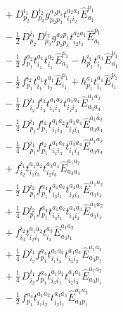 \documentclass[11pt]{article}
\begin{document}
\begin{align}
&\quad + D^{i_{1}}_{p_{2}} D^{i_{2}}_{p_{3}} g^{a_{2}p_{1}}_{p_{2}p_{3}} t^{a_{2}a_{1}}_{i_{1}i_{2}} \hat{E}^{p_{1}}_{a_{1}} \\
&\quad - \tfrac{1}{2}\, D^{i_{1}}_{p_{2}} D^{i_{2}}_{p_{3}} g^{a_{2}p_{1}}_{p_{2}p_{3}} t^{a_{2}a_{1}}_{i_{2}i_{1}} \hat{E}^{p_{1}}_{a_{1}} \\
&\quad - \tfrac{1}{2}\, f^{a_{2}}_{p_{1}} t^{a_{1}}_{i_{1}} t^{a_{2}}_{i_{1}} \hat{E}^{p_{1}}_{a_{1}} - h^{i_{1}}_{p_{1}} t^{a_{1}}_{i_{1}} \hat{E}^{p_{1}}_{a_{1}} \\
&\quad - \tfrac{1}{2}\, f^{i_{2}}_{p_{1}} t^{a_{1}}_{i_{1}} t^{a_{1}}_{i_{2}} \hat{E}^{p_{1}}_{i_{1}} + h^{a_{1}}_{p_{1}} t^{a_{1}}_{i_{1}} \hat{E}^{p_{1}}_{i_{1}} \\
&\quad - \tfrac{1}{2}\, D^{i_{1}}_{i_{2}} f^{i_{3}}_{i_{4}} t^{a_{1}a_{2}}_{i_{1}i_{3}} t^{a_{3}a_{4}}_{i_{2}i_{4}} \hat{E}^{a_{1}a_{2}}_{a_{3}a_{4}} \\
&\quad - \tfrac{1}{4}\, D^{i_{1}}_{p_{1}} f^{i_{2}}_{p_{1}} t^{a_{1}a_{2}}_{i_{1}i_{3}} t^{a_{3}a_{4}}_{i_{2}i_{3}} \hat{E}^{a_{1}a_{2}}_{a_{3}a_{4}} \\
&\quad - \tfrac{1}{4}\, D^{i_{1}}_{p_{1}} f^{i_{2}}_{p_{1}} t^{a_{1}a_{2}}_{i_{2}i_{3}} t^{a_{3}a_{4}}_{i_{1}i_{3}} \hat{E}^{a_{1}a_{2}}_{a_{3}a_{4}} \\
&\quad + f^{i_{1}}_{i_{2}} t^{a_{1}a_{2}}_{i_{1}i_{3}} t^{a_{3}a_{4}}_{i_{2}i_{3}} \hat{E}^{a_{1}a_{2}}_{a_{3}a_{4}} \\
&\quad - \tfrac{1}{2}\, D^{i_{2}}_{p_{1}} f^{a_{4}}_{p_{1}} t^{a_{1}a_{2}}_{i_{3}i_{1}} t^{a_{4}a_{3}}_{i_{2}i_{3}} \hat{E}^{a_{1}a_{2}}_{a_{3}i_{1}} \\
&\quad + \tfrac{1}{4}\, D^{i_{2}}_{p_{1}} f^{a_{4}}_{p_{1}} t^{a_{1}a_{2}}_{i_{3}i_{1}} t^{a_{4}a_{3}}_{i_{3}i_{2}} \hat{E}^{a_{1}a_{2}}_{a_{3}i_{1}} \\
&\quad + f^{i_{2}}_{i_{3}} t^{a_{1}a_{2}}_{i_{2}i_{1}} t^{a_{3}}_{i_{3}} \hat{E}^{a_{1}a_{2}}_{a_{3}i_{1}} \\
&\quad + \tfrac{1}{4}\, D^{i_{1}}_{i_{2}} f^{a_{4}}_{p_{1}} t^{a_{1}a_{2}}_{i_{1}i_{3}} t^{a_{4}a_{3}}_{i_{3}i_{2}} \hat{E}^{a_{1}a_{2}}_{a_{3}p_{1}} \\
&\quad + \tfrac{1}{4}\, D^{i_{1}}_{i_{2}} f^{a_{4}}_{p_{1}} t^{a_{1}a_{2}}_{i_{3}i_{1}} t^{a_{4}a_{3}}_{i_{2}i_{3}} \hat{E}^{a_{1}a_{2}}_{a_{3}p_{1}} \\
&\quad - \tfrac{1}{2}\, f^{a_{4}}_{p_{1}} t^{a_{1}a_{2}}_{i_{1}i_{2}} t^{a_{4}a_{3}}_{i_{2}i_{1}} \hat{E}^{a_{1}a_{2}}_{a_{3}p_{1}} \\

\end{align}
\end{document}
